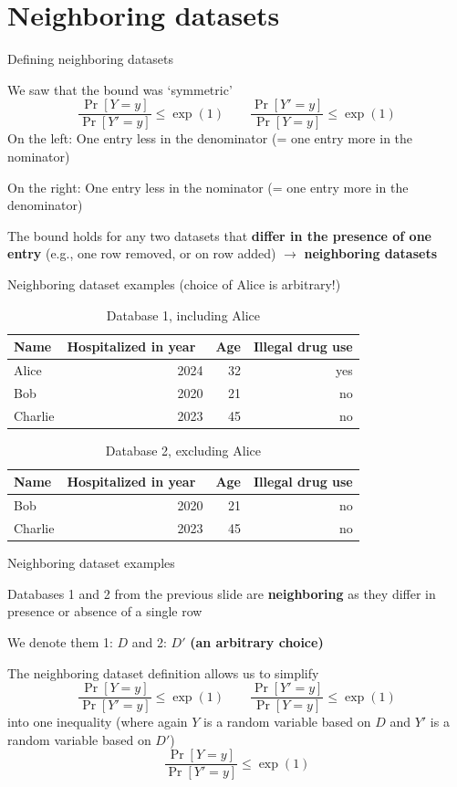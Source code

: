 \documentclass[12pt,aspectratio=169,handout]{beamer}
\begin{document}
\section{Neighboring datasets}

\begin{frame}{Defining neighboring datasets}
	
We saw that the bound was `symmetric'
$$
\frac{\Pr[Y = y]}{\Pr[Y' = y]} \leq \exp(1) \qquad
\frac{\Pr[Y' = y]}{\Pr[Y = y]} \leq \exp(1)
$$
On the left: One entry less in the denominator (= one entry more in the nominator)

On the right: One entry less in the nominator (= one entry more in the denominator)

The bound holds for any two datasets that \textbf{differ in the presence of one entry} (e.g., one row removed, or on row added) $\rightarrow$ \textbf{neighboring datasets}


\end{frame}

\begin{frame}{Neighboring dataset examples (choice of Alice is arbitrary!)}


\begin{table}
	\footnotesize
	\begin{tabular}{lrrr} \toprule
		Name & Hospitalized in year & Age & Illegal drug use \\ \midrule
		Alice & 2024 & 32 & yes \\
		Bob & 2020 & 21 & no \\
		Charlie & 2023 & 45 & no \\ \bottomrule
	\end{tabular}
	\caption{Database 1, including Alice}
\end{table}

\begin{table}
	\footnotesize
	\begin{tabular}{lrrr} \toprule
		Name & Hospitalized in year & Age & Illegal drug use \\ \midrule
		Bob & 2020 & 21 & no \\
		Charlie & 2023 & 45 & no \\ \bottomrule
	\end{tabular}
	\caption{Database 2, excluding Alice}
\end{table}
	
\end{frame}

\begin{frame}{Neighboring dataset examples}

Databases 1 and 2 from the previous slide are \textbf{neighboring} as they differ in presence or absence of a single row

We denote them 1: $D$ and 2: $D'$ \textbf{(an arbitrary choice)}

The neighboring dataset definition allows us to simplify
$$
\frac{\Pr[Y = y]}{\Pr[Y' = y]} \leq \exp(1) \qquad
\frac{\Pr[Y' = y]}{\Pr[Y = y]} \leq \exp(1)
$$
into one inequality (where again $Y$ is a random variable based on $D$ and $Y'$ is a random variable based on $D'$)
$$
\frac{\Pr[Y = y]}{\Pr[Y' = y]} \leq \exp(1)
$$

\end{frame}
\end{document}
